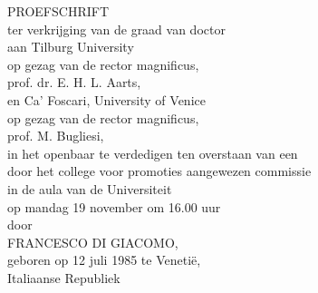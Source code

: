 \begin{titlepage}\centering
  \large \thetitle
	
	\vspace*{1.5cm}
	\large PROEFSCHRIFT\\
	\vspace*{1.5cm}
ter verkrijging van de graad van doctor\\
aan Tilburg University\\
op gezag van de rector magnificus,\\
prof. dr. E. H. L. Aarts,\\
en Ca' Foscari, University of Venice\\
op gezag van de rector magnificus,\\
prof. M. Bugliesi,\\
in het openbaar te verdedigen ten overstaan van een\\
door het college voor promoties aangewezen commissie\\
in de aula van de Universiteit\\
op mandag 19 november om 16.00 uur\\
\vspace*{1.5cm}
door\\
\vspace*{1.5cm}
\large FRANCESCO DI GIACOMO,\\
\vspace*{1.5cm}
geboren op 12 juli 1985 te Venetië,\\
Italiaanse Republiek


	
\end{titlepage}

\cleardoublepage
